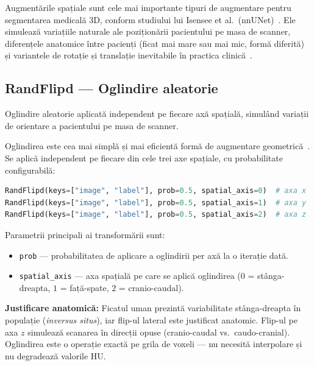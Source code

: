 \documentclass[12pt, a4paper]{report}
\begin{document}
Augmentările spațiale sunt cele mai importante tipuri de augmentare
pentru segmentarea medicală 3D, conform studiului lui Isensee et al.\
(nnUNet)~\cite{isensee2019automated}. Ele simulează variațiile naturale ale poziționării pacientului
pe masa de scanner, diferențele anatomice între pacienți (ficat mai mare
sau mai mic, formă diferită) și variantele de rotație și translație
inevitabile în practica clinică~\cite{cicek2016_3dunet}.

\subsection{RandFlipd — Oglindire aleatorie}
\label{sec:randflip}

\vspace{4pt}
\begin{infobox}
Oglindire aleatorie aplicată independent pe fiecare axă spațială,
simulând variații de orientare a pacientului pe masa de scanner.
\end{infobox}

Oglindirea este cea mai simplă și mai eficientă formă de augmentare
geometrică~\cite{isensee2019automated}. Se aplică independent pe fiecare din cele trei axe
spațiale, cu probabilitate configurabilă:

\begin{lstlisting}[language=Python]
RandFlipd(keys=["image", "label"], prob=0.5, spatial_axis=0)  # axa x
RandFlipd(keys=["image", "label"], prob=0.5, spatial_axis=1)  # axa y
RandFlipd(keys=["image", "label"], prob=0.5, spatial_axis=2)  # axa z
\end{lstlisting}

Parametrii principali ai transformării sunt:
\begin{itemize}
    \item \texttt{prob} — probabilitatea de aplicare a oglindirii
          per axă la o iterație dată.
    \item \texttt{spatial\_axis} — axa spațială pe care se aplică
          oglindirea ($0$ = stânga-dreapta, $1$ = față-spate,
          $2$ = cranio-caudal).
\end{itemize}

\textbf{Justificare anatomică:}
Ficatul uman prezintă variabilitate stânga-dreapta în populație
(\textit{inversus situs}), iar flip-ul lateral este justificat
anatomic. Flip-ul pe axa $z$ simulează scanarea în direcții opuse
(cranio-caudal vs.\ caudo-cranial). Oglindirea este o operație
exactă pe grila de voxeli — nu necesită interpolare și nu
degradează valorile HU.
\end{document}
